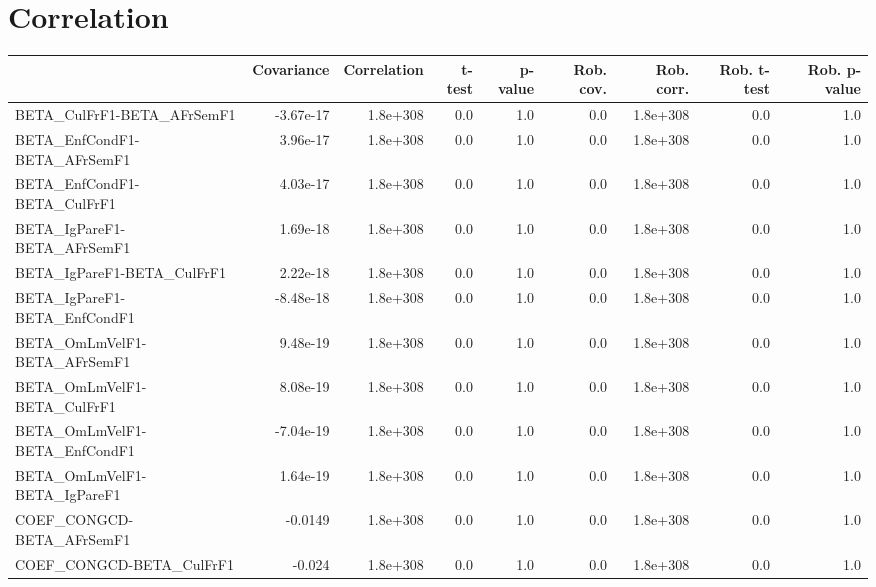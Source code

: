 \section{Correlation}
\begin{tabular}{lrrrrrrrr}
\toprule
{} &  Covariance &  Correlation &  t-test &  p-value &  Rob. cov. &  Rob. corr. &  Rob. t-test &  Rob. p-value \\
\midrule
BETA\_CulFrF1-BETA\_AFrSemF1            &   -3.67e-17 &     1.8e+308 &     0.0 &      1.0 &        0.0 &    1.8e+308 &          0.0 &           1.0 \\
BETA\_EnfCondF1-BETA\_AFrSemF1          &    3.96e-17 &     1.8e+308 &     0.0 &      1.0 &        0.0 &    1.8e+308 &          0.0 &           1.0 \\
BETA\_EnfCondF1-BETA\_CulFrF1           &    4.03e-17 &     1.8e+308 &     0.0 &      1.0 &        0.0 &    1.8e+308 &          0.0 &           1.0 \\
BETA\_IgPareF1-BETA\_AFrSemF1           &    1.69e-18 &     1.8e+308 &     0.0 &      1.0 &        0.0 &    1.8e+308 &          0.0 &           1.0 \\
BETA\_IgPareF1-BETA\_CulFrF1            &    2.22e-18 &     1.8e+308 &     0.0 &      1.0 &        0.0 &    1.8e+308 &          0.0 &           1.0 \\
BETA\_IgPareF1-BETA\_EnfCondF1          &   -8.48e-18 &     1.8e+308 &     0.0 &      1.0 &        0.0 &    1.8e+308 &          0.0 &           1.0 \\
BETA\_OmLmVelF1-BETA\_AFrSemF1          &    9.48e-19 &     1.8e+308 &     0.0 &      1.0 &        0.0 &    1.8e+308 &          0.0 &           1.0 \\
BETA\_OmLmVelF1-BETA\_CulFrF1           &    8.08e-19 &     1.8e+308 &     0.0 &      1.0 &        0.0 &    1.8e+308 &          0.0 &           1.0 \\
BETA\_OmLmVelF1-BETA\_EnfCondF1         &   -7.04e-19 &     1.8e+308 &     0.0 &      1.0 &        0.0 &    1.8e+308 &          0.0 &           1.0 \\
BETA\_OmLmVelF1-BETA\_IgPareF1          &    1.64e-19 &     1.8e+308 &     0.0 &      1.0 &        0.0 &    1.8e+308 &          0.0 &           1.0 \\
COEF\_CONGCD-BETA\_AFrSemF1             &     -0.0149 &     1.8e+308 &     0.0 &      1.0 &        0.0 &    1.8e+308 &          0.0 &           1.0 \\
COEF\_CONGCD-BETA\_CulFrF1              &      -0.024 &     1.8e+308 &     0.0 &      1.0 &        0.0 &    1.8e+308 &          0.0 &           1.0 \\

\end{tabular}
